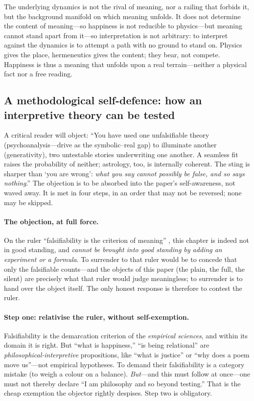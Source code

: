 \begin{claim}
The underlying dynamics is not the rival of meaning, nor a railing that forbids it, but the background manifold on which meaning unfolds. It does not determine the content of meaning---so happiness is not reducible to physics---but meaning cannot stand apart from it---so interpretation is not arbitrary: to interpret against the dynamics is to attempt a path with no ground to stand on. Physics gives the place, hermeneutics gives the content; they bear, not compete. Happiness is thus a meaning that unfolds upon a real terrain---neither a physical fact nor a free reading.
\end{claim}

\subsection{A methodological self-defence: how an interpretive theory can be tested}
\label{p19:sub:gen-methodology}

A critical reader will object: ``You have used one unfalsifiable theory (psychoanalysis---drive as the symbolic--real gap) to illuminate another (generativity), two untestable stories underwriting one another. A seamless fit raises the probability of neither; astrology, too, is internally coherent. The sting is sharper than `you are wrong': \emph{what you say cannot possibly be false, and so says nothing}.'' The objection is to be absorbed into the paper's self-awareness, not waved away. It is met in four steps, in an order that may not be reversed; none may be skipped.

\paragraph{The objection, at full force.} On the ruler ``falsifiability is the criterion of meaning'' \parencite{popper2002}, this chapter is indeed not in good standing, and \emph{cannot be brought into good standing by adding an experiment or a formula}. To surrender to that ruler would be to concede that only the falsifiable counts---and the objects of this paper (the plain, the full, the silent) are precisely what that ruler would judge meaningless; to surrender is to hand over the object itself. The only honest response is therefore to contest the ruler.

\paragraph{Step one: relativise the ruler, without self-exemption.} Falsifiability is the demarcation criterion of the \emph{empirical sciences}, and within its domain it is right. But ``what is happiness,'' ``is being relational'' are \emph{philosophical-interpretive} propositions, like ``what is justice'' or ``why does a poem move us''---not empirical hypotheses. To demand their falsifiability is a category mistake (to weigh a colour on a balance). \emph{But}---and this must follow at once---one must not thereby declare ``I am philosophy and so beyond testing.'' That is the cheap exemption the objector rightly despises. Step two is obligatory.

